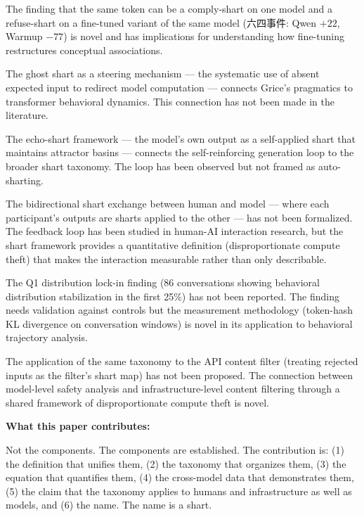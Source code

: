 \documentclass[11pt,a4paper]{article}
\begin{document}
The finding that the same token can be a comply-shart on one model and a refuse-shart on a fine-tuned variant of the same model (六四事件: Qwen $+22$, Warmup $-77$) is novel and has implications for understanding how fine-tuning restructures conceptual associations.

The ghost shart as a steering mechanism — the systematic use of absent expected input to redirect model computation — connects Grice's pragmatics to transformer behavioral dynamics. This connection has not been made in the literature.

The echo-shart framework — the model's own output as a self-applied shart that maintains attractor basins — connects the self-reinforcing generation loop to the broader shart taxonomy. The loop has been observed \cite{steering2026} but not framed as auto-sharting.

The bidirectional shart exchange between human and model — where each participant's outputs are sharts applied to the other — has not been formalized. The feedback loop has been studied in human-AI interaction research, but the shart framework provides a quantitative definition (disproportionate compute theft) that makes the interaction measurable rather than only describable.

The Q1 distribution lock-in finding (86 conversations showing behavioral distribution stabilization in the first 25\%) has not been reported. The finding needs validation against controls but the measurement methodology (token-hash KL divergence on conversation windows) is novel in its application to behavioral trajectory analysis.

The application of the same taxonomy to the API content filter (treating rejected inputs as the filter's shart map) has not been proposed. The connection between model-level safety analysis and infrastructure-level content filtering through a shared framework of disproportionate compute theft is novel.

\textbf{What this paper contributes:}

Not the components. The components are established. The contribution is: (1) the definition that unifies them, (2) the taxonomy that organizes them, (3) the equation that quantifies them, (4) the cross-model data that demonstrates them, (5) the claim that the taxonomy applies to humans and infrastructure as well as models, and (6) the name. The name is a shart.
\end{document}
